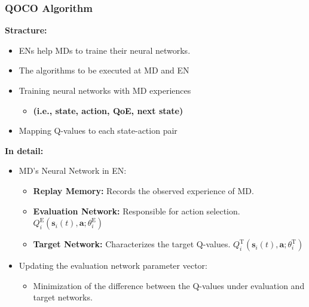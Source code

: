 \begin{frame}
	\frametitle{QOCO Algorithm}
	


	\textbf{Stracture:}
	
	
	\begin{itemize}[]
		\item ENs help MDs to traine their neural networks.
		\item The algorithms to be executed at MD and EN
		\item Training neural networks with MD experiences 

		


			\begin{itemize}{}
			\item \textbf{(i.e., state, action, QoE, next state)} 
		\end{itemize}
		\item Mapping Q-values to each state-action pair
		

	\end{itemize}

\vspace{4mm}

	
	\textbf{In detail:}
	\vspace{1mm}
\begin{itemize}
	\item MD's Neural Network in EN:

	\begin{itemize}{}
		\item \textbf{Replay Memory:} Records the observed experience of MD.
		\vspace{1mm}
		\item \textbf{Evaluation Network:} Responsible for action selection. $Q_i^{\text{E}}(\boldsymbol{s}_i(t), \boldsymbol{a}; \theta^{\text{E}}_i)$ 
			\vspace{1mm}
		\item \textbf{Target Network:} Characterizes the target Q-values. $Q_i^{\text{T}}(\boldsymbol{s}_i(t), \boldsymbol{a}; \theta^{\text{T}}_i)$
			\vspace{2mm}
	\end{itemize}
	\item Updating the evaluation network parameter vector:
	\begin{itemize}
		\item Minimization of the difference between the Q-values under evaluation and target networks.
	\end{itemize}
\end{itemize}
	
	
\end{frame}

